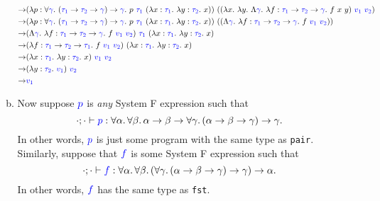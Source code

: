 \documentclass{article}
\theoremstyle{definition}
\newcommand{\meta}[1]{{\color{blue}#1}}
\begin{document}
\begin{enumerate}[start=1,label={{\bf Problem \arabic*}.},ref=\arabic*,left=0pt..0pt,widest*=10,align=left,itemindent=*]
\begin{enumerate}[(a),left=1em]
\begin{align*}
      \to & (\lambda p : \forall \meta{\gamma}.\ (\meta{\tau_1}\to\meta{\tau_2}\to\meta{\gamma}) \to \meta{\gamma}.\ p\ \meta{\tau_1}\ (\lambda x : \meta{\tau_1}.\ \lambda y : \meta{\tau_2}.\ x))\ ((\lambda x.\ \lambda y.\ \Lambda \meta{\gamma}.\ \lambda f : \meta{\tau_1} \to \meta{\tau_2} \to \meta{\gamma}.\ f\ x\ y)\ \meta{v_1}\ \meta{v_2}) \\
      \to & (\lambda p : \forall \meta{\gamma}.\ (\meta{\tau_1}\to\meta{\tau_2}\to\meta{\gamma}) \to \meta{\gamma}.\ p\ \meta{\tau_1}\ (\lambda x : \meta{\tau_1}.\ \lambda y : \meta{\tau_2}.\ x))\ ((\Lambda \meta{\gamma}.\ \lambda f : \meta{\tau_1} \to \meta{\tau_2} \to \meta{\gamma}.\ f\ \meta{v_1}\ \meta{v_2})) \\
      \to & (\Lambda \meta{\gamma}.\ \lambda f : \meta{\tau_1} \to \meta{\tau_2} \to \meta{\gamma}.\ f\ \meta{v_1}\ \meta{v_2})\ \meta{\tau_1}\ (\lambda x : \meta{\tau_1}.\ \lambda y : \meta{\tau_2}.\ x) \\
      \to & (\lambda f : \meta{\tau_1} \to \meta{\tau_2} \to \meta{\tau_1}.\ f\ \meta{v_1}\ \meta{v_2})\ (\lambda x : \meta{\tau_1}.\ \lambda y : \meta{\tau_2}.\ x) \\
      \to & (\lambda x : \meta{\tau_1}.\ \lambda y : \meta{\tau_2}.\ x)\ \meta{v_1}\ \meta{v_2} \\
      \to & (\lambda y : \meta{\tau_2}.\ \meta{v_1})\ \meta{v_2} \\
      \to & \meta{v_1}
    \end{align*}

  \item Now suppose $\meta{p}$ is \emph{any} System F expression such that
    \[
      \cdot;\cdot\vdash \meta{p}:\forall\alpha.\,\forall\beta.\, \alpha\to\beta\to \forall\gamma.\, (\alpha\to\beta\to\gamma)\to\gamma.
    \]
    In other words, $\meta{p}$ is just some program with the same type as
    \texttt{pair}.  Similarly, suppose that $\meta{f}$ is some System F
    expression such that
    \[
      \cdot;\cdot\vdash \meta{f}:\forall\alpha.\,\forall\beta.\, (\forall\gamma.\, (\alpha\to\beta\to\gamma)\to\gamma) \to \alpha.
    \]
    In other words, $\meta{f}$ has the same type as \texttt{fst}.


\end{enumerate}
\end{enumerate}
\end{document}
